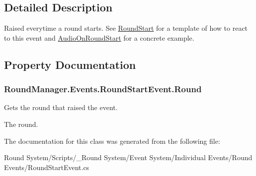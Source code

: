 \subsection{Detailed Description}
Raised everytime a round starts. See \hyperlink{class_round_manager_1_1_round_start}{Round\+Start} for a template of how to react to this event and \hyperlink{class_round_manager_1_1_audio_on_round_start}{Audio\+On\+Round\+Start} for a concrete example. 



\subsection{Property Documentation}
\hypertarget{class_round_manager_1_1_events_1_1_round_start_event_a03a06a2905d11b967ed45d4f902c5f93}{}
\subsubsection[{Round}]{ Round\+Manager.\+Events.\+Round\+Start\+Event.\+Round\hspace{0.3cm}{\ttfamily [get]}}\label{class_round_manager_1_1_events_1_1_round_start_event_a03a06a2905d11b967ed45d4f902c5f93}


Gets the round that raised the event. 

The round.

The documentation for this class was generated from the following file\+:\begin{DoxyCompactItemize}
\item 
Round System/\+Scripts/\+\_\+\+Round System/\+Event System/\+Individual Events/\+Round Events/Round\+Start\+Event.\+cs\end{DoxyCompactItemize}
